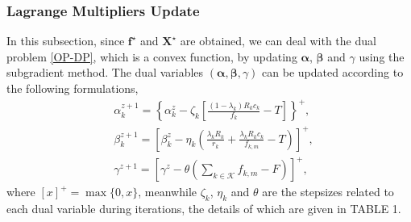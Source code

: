 \documentclass[journal]{IEEEtran}
\begin{document}
    \subsubsection{Lagrange Multipliers Update} In this subsection, since $\boldsymbol{f^\star}$ and $\boldsymbol{X^\star}$ are obtained, we can deal with the dual problem \eqref{OP-DP}, which is a convex function, by updating $\boldsymbol{\alpha}$, $\boldsymbol{\beta}$ and $\gamma$ using the subgradient method.
    The dual variables $(\boldsymbol\alpha,\boldsymbol\beta,\gamma)$ can be updated according to the following formulations,
    \begin{equation}
        \label{op-u}
        \begin{aligned}
            &\alpha_{k}^{z+1}=\left\{\alpha_{k}^{z}-\zeta_{k}\left[ \frac{(1-\lambda_{k})R_{k}c_{k}}{f_{k}}-T\right]\right\}^{+},\\
            &\beta_{k}^{z+1}=\left[\beta_{k}^{z}-\eta_{k}\left(\frac{\lambda_{k}R_{k}}{r_{k}}+\frac{\lambda_{k}R_{k}c_{k}}{f_{k,m}}-T \right)\right]^{+},\\
            &\gamma^{z+1}=\left[\gamma^{z}-\theta\left(\sum_{k\in\mathcal{K}}f_{k,m} - F\right)\right]^{+},
        \end{aligned}
    \end{equation}
    where $[x]^{+} = \max\{0,x\}$, meanwhile $\zeta_k$, $\eta_k$ and $\theta$ are the stepsizes related to each dual variable during iterations, the details of which are given in TABLE 1.
\end{document}
